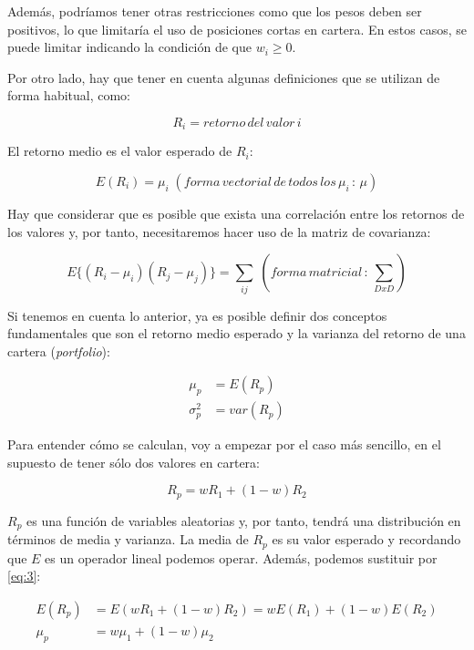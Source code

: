 Además, podríamos tener otras restricciones como que los pesos deben ser positivos, lo que limitaría el uso de posiciones cortas \citep{wiki:posicion_corta} en cartera. En estos casos, se puede limitar indicando la condición de que $w_{i} \geq 0$. 

Por otro lado, hay que tener en cuenta algunas definiciones que se utilizan de forma habitual, como:

\begin{equation*}
	R_{i} = retorno\, del\, valor\, i
\end{equation*}

El retorno medio es el valor esperado de $R_{i}$:

\begin{equation}
	E(R_{i}) = \mu_{i}\;  (forma\, vectorial\, de\, todos\, los\, \mu_{i}\, :\, \mu)
\end{equation}

Hay que considerar que es posible que exista una correlación entre los retornos de los valores y, por tanto, necesitaremos hacer uso de la matriz de covarianza:

\begin{equation}
	E\{(R_{i}-\mu_{i}) (R_{j}-\mu_{j})\} = \sum_{ij}\;  (forma\, matricial\, :\, \sum_{DxD})
\end{equation}

Si tenemos en cuenta lo anterior, ya es posible definir dos conceptos fundamentales que son el retorno medio esperado y la varianza del retorno de una cartera (\emph{portfolio}):

\begin{align} \label{eq:4}
	\mu_{p} &= E(R_{p})\\
	\sigma_{p}^{2} &= var(R_{p})
\end{align}

Para entender cómo se calculan, voy a empezar por el caso más  sencillo, en el supuesto de tener sólo dos valores en cartera:

\begin{equation} \label{eq:5}
	R_{p} = wR_{1} + (1 - w)R_{2}
\end{equation}

$R_{p}$ es una función de variables aleatorias y, por tanto, tendrá una distribución en términos de media y varianza. La media de $R_{p}$ es su valor esperado y recordando que $E$ es un operador lineal podemos operar. Además, podemos sustituir por \ref{eq:3}:

\begin{align} 
    E(R_{p}) &= E(wR_{1} + (1-w)R_{2}) = wE(R_{1}) + (1-w)E(R_{2}) \\
    \mu_{p}  &= w\mu_{1} + (1-w)\mu_{2}
    \label{eq:4}
\end{align}

